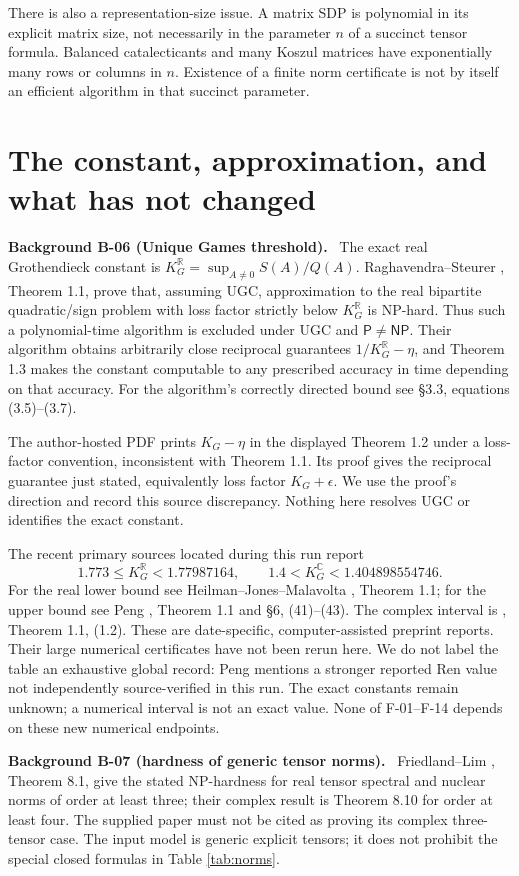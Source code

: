 \documentclass[11pt]{article}
\newcommand{\R}{\mathbb R}\newcommand{\C}{\mathbb C}
\newenvironment{background}[2]{\par\medskip\noindent\textbf{Background #1 (#2).}\ }{\par\medskip}
\begin{document}
There is also a representation-size issue. A matrix SDP is polynomial
in its explicit matrix size, not necessarily in the parameter $n$
of a succinct tensor formula. Balanced catalecticants and many
Koszul matrices have exponentially many rows or columns in $n$.
Existence of a finite norm certificate is not by itself an efficient
algorithm in that succinct parameter.

\section{The constant, approximation, and what has not changed}
\begin{background}{B-06}{Unique Games threshold}
The exact real Grothendieck constant is
$K_G^\R=\sup_{A\ne0}S(A)/Q(A)$.
Raghavendra--Steurer \cite{RS}, Theorem 1.1, prove that,
assuming UGC, approximation to the real bipartite quadratic/sign
problem with loss factor strictly below $K_G^\R$ is NP-hard.
Thus such a polynomial-time algorithm is excluded under UGC
and $\mathsf P\ne\mathsf{NP}$. Their algorithm obtains arbitrarily close reciprocal
guarantees $1/K_G^\R-\eta$, and Theorem 1.3 makes the constant
computable to any prescribed accuracy in time depending on that
accuracy. For the algorithm's correctly directed bound see
\S3.3, equations (3.5)--(3.7).
\end{background}
The author-hosted PDF prints $K_G-\eta$ in the displayed
Theorem 1.2 under a loss-factor convention, inconsistent with
Theorem 1.1. Its proof gives the reciprocal guarantee just stated,
equivalently loss factor $K_G+\epsilon$.
We use the proof's direction and record this source discrepancy.
Nothing here resolves UGC or identifies the exact constant.

The recent primary sources located during this run report
\[
 1.773\leq K_G^\R<1.77987164,\qquad
 1.4<K_G^\C<1.404898554746.
\]
For the real lower bound see Heilman--Jones--Malavolta
\cite{HJMreal}, Theorem 1.1; for the upper bound see Peng
\cite{Peng}, Theorem 1.1 and \S6, (41)--(43).
The complex interval is \cite{HJMcomplex}, Theorem 1.1, (1.2).
These are date-specific, computer-assisted preprint reports.
Their large numerical certificates have not been rerun here.
We do not label the table an exhaustive global record: Peng
mentions a stronger reported Ren value not independently
source-verified in this run. The exact constants remain unknown;
a numerical interval is not an exact value.
None of F-01--F-14 depends on these new numerical endpoints.

\begin{background}{B-07}{hardness of generic tensor norms}
Friedland--Lim \cite{FL}, Theorem 8.1, give the stated
NP-hardness for real tensor spectral and nuclear norms of order
at least three; their complex result is Theorem 8.10 for order
at least four. The supplied paper must not be cited as proving
its complex three-tensor case. The input model is generic
explicit tensors; it does not prohibit the special closed
formulas in Table \ref{tab:norms}.
\end{background}
\end{document}
